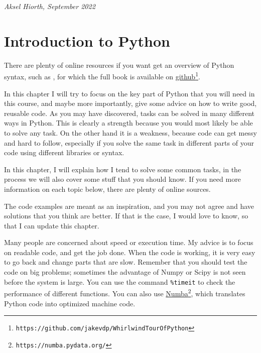 \documentclass[graybox,sectrefs,envcountresetchap,open=right,final]{svmonodo}
\newenvironment{graybox2admon}[1][]{
\begin{graybox2mdframed}[frametitle=#1]
}
{
\end{graybox2mdframed}
}
\begin{document}
\noindent
\noindent

\hfill{\it Aksel Hiorth, September 2022  }

\tableofcontents

\vspace{1cm} %

\mainmatter

\chapter{Introduction to Python}
\label{ch:pyt}

There are plenty of online resources if you want get an overview of Python syntax, such as \cite{vanderplas2016whirlwind}, for which the full book is available on \href{{https://github.com/jakevdp/WhirlwindTourOfPython}}{github}\footnote{\texttt{https://github.com/jakevdp/WhirlwindTourOfPython}}.

In this chapter I will try to focus on the key part of Python that you will need in this course, and maybe more importantly, give some advice on how to write good, reusable code. As you may have discovered, tasks can be solved in many different ways in Python. This is clearly a strength because you would most likely be able to solve any task. On the other hand it is a weakness, because code can get messy and hard to follow, especially if you solve the same task in different parts of your code using different libraries or syntax.

In this chapter, I will explain how I tend to solve some common tasks, in the process we will also cover some stuff that you should know. If you need more information on each topic below, there are plenty of online sources. 

The code examples are meant as an inspiration, and you may not agree and have solutions that you think are better. If that is the case, I would love to know, so that I can update this chapter.



\begin{graybox2admon}[Speed and readability]
Many people are concerned about speed or execution time. My advice is to focus on readable code, and get the job done. When the code is working, it is very easy to go back and change parts that are slow. Remember that you should test the code on big problems; sometimes the advantage of Numpy or Scipy is not seen before the system is large. You can use the command \Verb!%
\end{graybox2admon}
\end{document}
